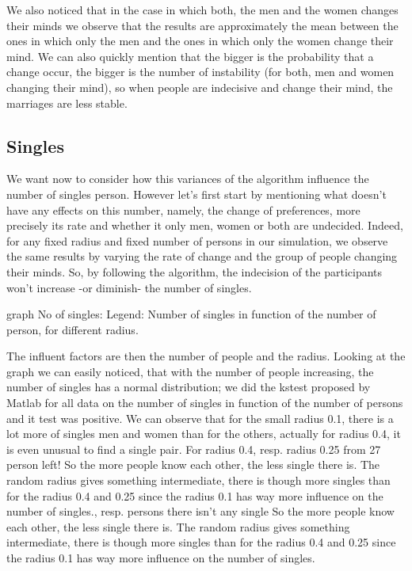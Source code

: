 \documentclass[11pt]{article}
\begin{document}
We also noticed that in the case in which both, the men and the women changes their minds we 
observe that the results are approximately the mean between the ones in which only the men and 
the ones in which only the women change their mind.
 We can also quickly mention that the bigger is the probability that a change occur, the bigger is the 
number of instability (for both, men and women changing their mind), so when people are indecisive 
and change their mind, the marriages are less stable.

\subsection{Singles}

We want now to consider how this variances of the algorithm influence the number of singles
person. However let’s first start by mentioning what doesn’t have any effects on this number, 
namely, the change of preferences, more precisely its rate and whether it only men, women or both 
are undecided. Indeed, for any fixed radius and fixed number of persons in our simulation, we 
observe the same results by varying the rate of change and the group of people changing their 
minds. So, by following the algorithm, the indecision of the participants won’t increase -or diminish-
the number of singles.

{graph No of singles: Legend: Number of singles in function of the number of person, for different 
radius.}

 The influent factors are then the number of people and the radius. Looking at the graph we can 
easily noticed, that with the number of people increasing, the number of singles has a normal
distribution; we did the kstest proposed by Matlab for all data on the number of singles in function of 
the number of persons and it test was positive. We can observe that for the small radius 0.1, there is 
a lot more of singles men and women than for the others, actually for radius 0.4, it is even unusual to 
find a single pair. For radius 0.4, resp. radius 0.25 from 27
person left! So the more people know each other, the less single there is. The random radius gives 
something intermediate, there is though more singles than for the radius 0.4 and 0.25 since the 
radius 0.1 has way more influence on the number of singles., resp.  persons there isn’t any single
So the more people know each other, the less single there is. The random radius gives
something intermediate, there is though more singles than for the radius 0.4 and 0.25 since the 
radius 0.1 has way more influence on the number of singles.
\end{document}

